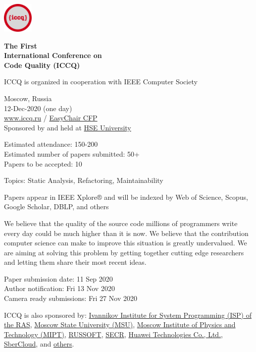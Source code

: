 \documentclass[12pt,oneside]{article}
\begin{document}
\selectfont
\raggedbottom
\raggedright
\setlength{\topskip}{6pt}
\setlength{\parindent}{0pt} %
\setlength{\parskip}{6pt} %

\includegraphics[height=4em]{../logo}

\textcolor{xred}{\bfseries
{\large The First} \\
{\Large International Conference on\\[3pt]
Code Quality (ICCQ)}}

{ICCQ is organized in cooperation with IEEE Computer Society}
\vspace{6pt}

Moscow, Russia \\
12-Dec-2020 (one day) \\
\href{https://www.iccq.ru}{www.iccq.ru} / \href{https://easychair.org/cfp/ICCQ20}{EasyChair CFP}\\

Sponsored by and held at \href{https://www.hse.ru/en/}{HSE University}

Estimated attendance: 150-200 \\
Estimated number of papers submitted: 50+ \\
Papers to be accepted: 10

\vspace{6pt}

Topics: Static Analysis, Refactoring, Maintainability

Papers appear in IEEE Xplore® and will be indexed by Web of Science, Scopus, Google Scholar, DBLP, and others

We believe that the quality of the source code millions of programmers
write every day could be much higher than it is now. We believe that the
contribution computer science can make to improve this situation is greatly
undervalued. We are aiming at solving this problem by getting
together cutting edge researchers and letting them share their most recent ideas.

\vspace{6pt}

Paper submission date: 11 Sep 2020 \\
Author notification: Fri 13 Nov 2020 \\
Camera ready submissions: Fri 27 Nov 2020

\vspace{6pt}

ICCQ is also sponsored by:
\href{https://www.ispras.ru/en/}{Ivannikov Institute for System Programming (ISP) of the RAS},
\href{https://www.msu.ru/}{Moscow State University (MSU)},
\href{https://mipt.ru/english/}{Moscow Institute of Physics and Technology (MIPT)},
\href{https://russoft.org/en/}{RUSSOFT},
\href{https://2021.secrus.org/?lang=en}{SECR},
\href{https://www.huawei.com}{Huawei Technologies Co., Ltd.},
\href{https://sbercloud.ru/}{SberCloud},
and \href{https://www.iccq.ru/#partners}{others}.
\end{document}
